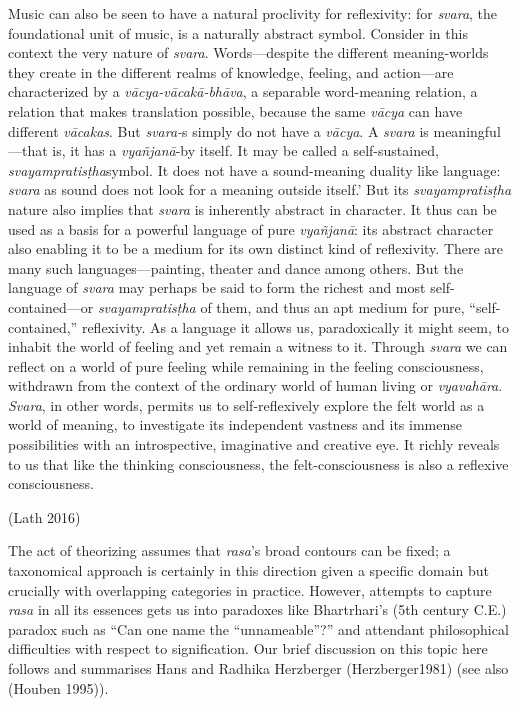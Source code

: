 \begin{myquote}
Music can also be seen to have a natural proclivity for reflexivity: for \textsl{svara}, the foundational unit of music, is a naturally abstract symbol. Consider in this context the very nature of \textsl{svara}. Words—despite the different meaning-worlds they create in the different realms of knowledge, feeling, and action—are characterized by a \textsl{vācya-vācakā-bhāva}, a separable word-meaning relation, a relation that makes translation possible, because the same \textsl{vācya} can have different \textsl{vācakas}. But \textsl{svara-}s simply do not have a \textsl{vācya}. A \textsl{svara} is meaningful—that is, it has a \textsl{vyañjanā}-by itself. It may be called a self-sustained, \textsl{svayampratisṭha}symbol. It does not have a sound-meaning duality like language: \textsl{svara} as sound does not look for a meaning outside itself.' But its \textsl{svayampratisṭha} nature also implies that \textsl{svara} is inherently abstract in character. It thus can be used as a basis for a powerful language of pure \textsl{vyañjanā}: its abstract character also enabling it to be a medium for its own distinct kind of reflexivity. There are many such languages—painting, theater and dance among others. But the language of \textsl{svara} may perhaps be said to form the richest and most self-contained—or \textsl{svayampratisṭha} of them, and thus an apt medium for pure, “self-contained,” reflexivity. As a language it allows us, paradoxically it might seem, to inhabit the world of feeling and yet remain a witness to it. Through \textsl{svara} we can reflect on a world of pure feeling while remaining in the feeling consciousness, withdrawn from the context of the ordinary world of human living or \textsl{vyavahāra}. \textsl{Svara}, in other words, permits us to self-reflexively explore the felt world as a world of meaning, to investigate its independent vastness and its immense possibilities with an introspective, imaginative and creative eye. It richly reveals to us that like the thinking consciousness, the felt-consciousness is also a reflexive consciousness. 

\hfill(Lath 2016)
\end{myquote}

The act of theorizing assumes that \textsl{rasa}’s broad contours can be fixed; a taxonomical approach is certainly in this direction given a specific domain but crucially with overlapping categories in practice. However, attempts to capture \textsl{rasa} in all its essences gets us into paradoxes like Bhartrhari's (5th century C.E.) paradox such as “Can one name the “unnameable”?” and attendant philosophical difficulties with respect to signification. Our brief discussion on this topic here follows and summarises Hans and Radhika Herzberger (Herzberger1981) (see also (Houben 1995)).

